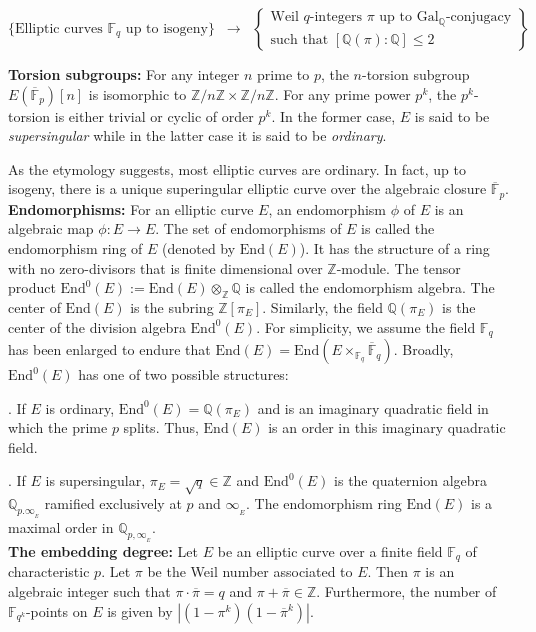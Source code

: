 \documentclass[11pt, lettersize, notitlepage, leqno, footskip=0.6cm]{article}
\newcommand{\bz}{\mathbb Z}
\newcommand{\bq}{\mathbb Q}
\newcommand{\bFP}{\ov{\mathbb{F}}_p}
\newcommand{\bFq}{\mathbb{F}_q}
\newcommand{\bFqk}{\mathbb{F}_{q^k}}
\newcommand{\bFQ}{\ov{\mathbb{F}}_q}
\newcommand{\absq}{\mathrm{Gal}_{\bq}}
\newcommand{\lra}{\longrightarrow}
\newcommand{\mr}{\mathrm}
\newcommand{\ov}{\overline}
\newcommand{\noin}{\noindent}
\newcommand{\End}{\mr{End}}
\numberwithin{equation}{section}
\begin{document}
\[
  \{ \text{Elliptic curves } \bFq \text{ up to isogeny}  \} \;\;\lra\;\; \left\{\begin{array}{l}
    \text{Weil } q\text{-integers } \pi \text{ up to } \absq\text{-conjugacy}\\ 
    \text{such that } [\bq(\pi):\bq]\leq 2
  \end{array}\right\}
\]

\noin \textbf{Torsion subgroups:} For any integer $n$ prime to $p$, the $n$-torsion subgroup $E(\bFP)[n]$ is isomorphic to $\bz/n\bz\times \bz/n\bz$. For any prime power $p^k$, the $p^k$-torsion is either trivial or cyclic of order $p^k$. In the former case, $E$ is said to be \textit{supersingular} while in the latter case it is said to be \textit{ordinary}. 

As the etymology suggests, most elliptic curves are ordinary. In fact, up to isogeny, there is a unique superingular elliptic curve over the algebraic closure $\bFP$.\\
   


\noin \textbf{Endomorphisms:} For an elliptic curve $E$, an endomorphism $\phi$ of $E$ is an algebraic map $\phi:E\lra E$. The set of endomorphisms of $E$ is called the endomorphism ring of $E$ (denoted by $\End(E)$). It has the structure of a ring with no zero-divisors that is finite dimensional over $\bz$-module. The tensor product $\End^0(E):= \End(E)\otimes_{\bz}\bq$ is called the endomorphism algebra. The center of $\End(E)$ is the subring $\bz[\pi_E]$. Similarly, the field $\bq(\pi_E)$ is the center of the division algebra $\End^0(E)$. For simplicity, we assume the field $\bFq$ has been enlarged to endure that $\End(E) = \End(E\times_{\bFq} \bFQ)$. Broadly, $\End^0(E)$ has one of two possible structures:

\noin 1. If $E$ is ordinary, $\End^0(E) = \bq(\pi_E)$ and is an imaginary quadratic field in which the prime $p$ splits. Thus, $\End(E)$ is an order in this imaginary quadratic field.

\noin 2. If $E$ is supersingular, $\pi_E = \sqrt{q} \in \bz$ and $\End^0(E)$ is the quaternion algebra $\bq_{p.\infty_{_E}}$ ramified exclusively at $p$ and $\infty_{_E}$. The endomorphism ring $\End(E)$ is a maximal order in $\bq_{p,\infty_{_E}}$.\\

\noin \textbf{The embedding degree:} Let $E$ be an elliptic curve over a finite field $\bFq$  of characteristic $p$. Let $\pi$ be the Weil number associated to $E$. Then $\pi$ is an algebraic integer such that $\pi\cdot \ov{\pi} = q$ and $\pi+\ov{\pi}\in \bz$. Furthermore, the number of $\bFqk$-points on $E$ is given by $|(1-\pi^k)(1-\ov{\pi}^k)|$.
\end{document}
